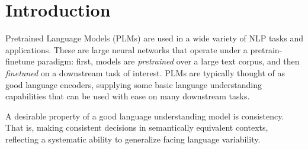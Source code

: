 \section{Introduction}
\label{sec:intro}

Pretrained Language Models (PLMs) are used in a wide variety of NLP tasks and applications. These are large neural networks that operate under a pretrain-finetune paradigm: first, models are \emph{pretrained} over a large text corpus, and then \emph{finetuned} on a downstream task of interest. PLMs are typically thought of as good language encoders, supplying some basic language understanding capabilities that can be used with ease on many downstream tasks.

A desirable property of a good language understanding model is consistency. That is, making consistent decisions in semantically equivalent contexts, reflecting a systematic ability to generalize facing language variability.


